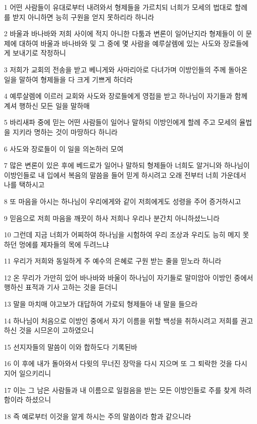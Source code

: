 \par 1 어떤 사람들이 유대로부터 내려와서 형제들을 가르치되 너희가 모세의 법대로 할례를 받지 아니하면 능히 구원을 얻지 못하리라 하니라
\par 2 바울과 바나바와 저희 사이에 적지 아니한 다툼과 변론이 일어난지라 형제들이 이 문제에 대하여 바울과 바나바와 및 그 중에 몇 사람을 예루살렘에 있는 사도와 장로들에게 보내기로 작정하니
\par 3 저희가 교회의 전송을 받고 베니게와 사마리아로 다녀가며 이방인들의 주께 돌아온 일을 말하여 형제들을 다 크게 기쁘게 하더라
\par 4 예루살렘에 이르러 교회와 사도와 장로들에게 영접을 받고 하나님이 자기들과 함께 계셔 행하신 모든 일을 말하매
\par 5 바리새파 중에 믿는 어떤 사람들이 일어나 말하되 이방인에게 할례 주고 모세의 율법을 지키라 명하는 것이 마땅하다 하니라
\par 6 사도와 장로들이 이 일을 의논하러 모여
\par 7 많은 변론이 있은 후에 베드로가 일어나 말하되 형제들아 너희도 알거니와 하나님이 이방인들로 내 입에서 복음의 말씀을 들어 믿게 하시려고 오래 전부터 너희 가운데서 나를 택하시고
\par 8 또 마음을 아시는 하나님이 우리에게와 같이 저희에게도 성령을 주어 증거하시고
\par 9 믿음으로 저희 마음을 깨끗이 하사 저희나 우리나 분간치 아니하셨느니라
\par 10 그런데 지금 너희가 어찌하여 하나님을 시험하여 우리 조상과 우리도 능히 메지 못하던 멍에를 제자들의 목에 두려느냐
\par 11 우리가 저희와 동일하게 주 예수의 은혜로 구원 받는 줄을 믿노라 하니라
\par 12 온 무리가 가만히 있어 바나바와 바울이 하나님이 자기들로 말미암아 이방인 중에서 행하신 표적과 기사 고하는 것을 듣더니
\par 13 말을 마치매 야고보가 대답하여 가로되 형제들아 내 말을 들으라
\par 14 하나님이 처음으로 이방인 중에서 자기 이름을 위할 백성을 취하시려고 저희를 권고하신 것을 시므온이 고하였으니
\par 15 선지자들의 말씀이 이와 합하도다 기록된바
\par 16 이 후에 내가 돌아와서 다윗의 무너진 장막을 다시 지으며 또 그 퇴락한 것을 다시 지어 일으키리니
\par 17 이는 그 남은 사람들과 내 이름으로 일컬음을 받는 모든 이방인들로 주를 찾게 하려 함이라 하셨으니
\par 18 즉 예로부터 이것을 알게 하시는 주의 말씀이라 함과 같으니라
